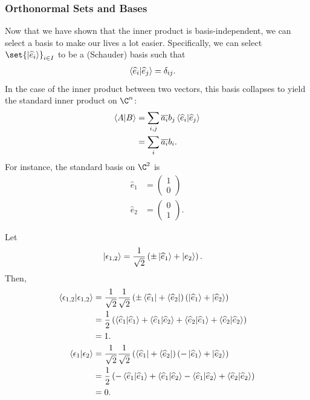 \documentclass[10pt]{mypackage}
\begin{document}
\subsubsection{Orthonormal Sets and Bases}%
Now that we have shown that the inner product is basis-independent, we can select a basis to make our lives a lot easier. Specifically, we can select $\set{\ket{\widehat{e}_i}}_{i\in I}$ to be a (Schauder) basis such that
\begin{align*}
  \braket{\widehat{e}_i}{\widehat{e}_j} &= \delta_{ij}.
\end{align*}
In the case of the inner product between two vectors, this basis collapses to yield the standard inner product on $\C^n$:
\begin{align*}
  \braket{A}{B} &= \sum_{i,j}\overline{a_i}b_j \braket{\widehat{e}_i}{\widehat{e}_j}\\
                &= \sum_{i}\overline{a_i}b_i.
\end{align*}
For instance, the standard basis on $\C^2$ is
\begin{align*}
  \widehat{e}_{1} &= \begin{pmatrix}1\\0\end{pmatrix}\\
  \widehat{e}_{2} &= \begin{pmatrix}0\\1\end{pmatrix}.
\end{align*}
\begin{example}
Let
\begin{align*}
  \ket{\epsilon_{1,2}} &= \frac{1}{\sqrt{2}}\left(\pm \ket{\widehat{e}_1} + \ket{e_2}\right).
\end{align*}
Then,
\begin{align*}
  \braket{\epsilon_{1,2}}{\epsilon_{1,2}} &= \frac{1}{\sqrt{2}}\frac{1}{\sqrt{2}}\left(\pm\bra{\widehat{e}_1} + \bra{\widehat{e}_2}\right)\left(\ket{\widehat{e}_1} + \ket{\widehat{e}_2}\right)\\
                                  &= \frac{1}{2}\left(\braket{\widehat{e}_1}{\widehat{e}_1} + \braket{\widehat{e}_1}{\widehat{e}_2} + \braket{\widehat{e}_2}{\widehat{e}_1} + \braket{\widehat{e}_2}{\widehat{e}_2}\right)\\
                                  &= 1.\\
  \braket{\epsilon_1}{\epsilon_2} &= \frac{1}{\sqrt{2}}\frac{1}{\sqrt{2}}\left(\bra{\widehat{e}_1} + \bra{\widehat{e}_2}\right)\left(-\ket{\widehat{e}_1} + \ket{\widehat{e}_2}\right)\\
                                  &= \frac{1}{2}\left(-\braket{\widehat{e}_1}{\widehat{e}_1} + \braket{\widehat{e}_1}{\widehat{e}_2} - \braket{\widehat{e}_1}{\widehat{e}_2} + \braket{\widehat{e}_2}{\widehat{e}_2}\right)\\
                                  &=0.
\end{align*}
\end{example}
\end{document}
